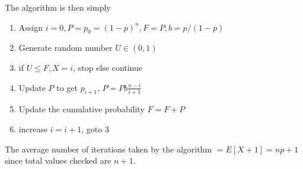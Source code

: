 \documentclass[../probability-notes.tex]{subfiles}
\begin{document}
    The algorithm is then simply
    \begin{enumerate}
        \item Assign $i = 0, P = p_{0} = (1-p)^{n}, F = P, b = p/(1-p)$
        \item Generate random number $U \in (0, 1)$
        \item if $U \leq F, X = i$, stop else continue
        \item Update $P$ to get $p_{i+1}$, $P = Pb\frac{n-i}{i+1}$
        \item Update the cumulative probability $F = F + P$
        \item increase $i = i + 1$, goto 3
    \end{enumerate}

    The average number of iterations taken by the algorithm $= E[X + 1] = np + 1$ since total values checked are $n + 1$.
\end{document}
